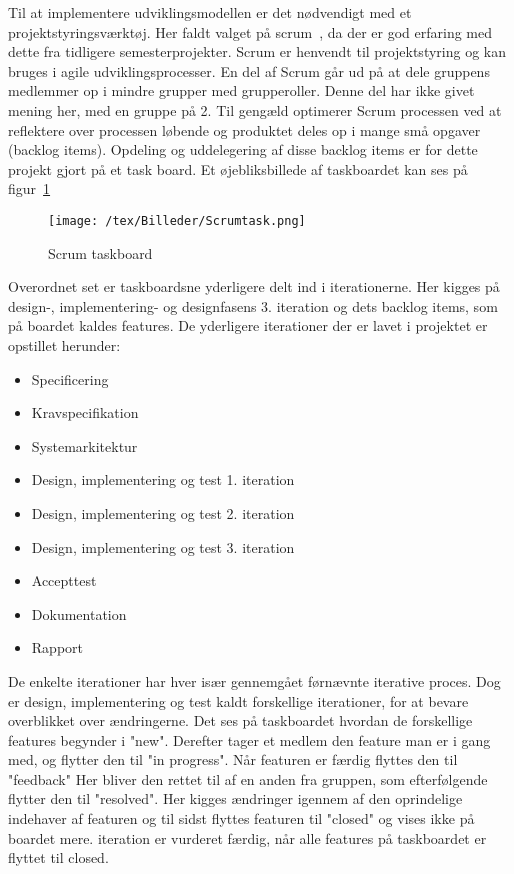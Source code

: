 Til at implementere udviklingsmodellen er det nødvendigt med et projektstyringsværktøj. Her faldt valget på scrum~\cite{Scrum}, da der er god erfaring med dette fra tidligere semesterprojekter. Scrum er henvendt til projektstyring og kan bruges i agile udviklingsprocesser. En del af Scrum går ud på at dele gruppens medlemmer op i mindre grupper med grupperoller. Denne del har ikke givet mening her, med en gruppe på 2. 
Til gengæld optimerer Scrum processen ved at reflektere over processen løbende og produktet deles op i mange små opgaver (backlog items). Opdeling og uddelegering af disse backlog items er for dette projekt gjort på et task board. Et øjebliksbillede af taskboardet kan ses på figur~\ref{fig:Taskboard} 
\begin{figure}[H]
	\center
	\texttt{[image: /tex/Billeder/Scrumtask.png]}
	\caption{Scrum taskboard}
	\label{fig:Taskboard}
\end{figure} 
Overordnet set er taskboardsne yderligere delt ind i iterationerne. Her kigges på design-, implementering- og designfasens 3. iteration og dets backlog items, som på boardet kaldes features. De yderligere iterationer der er lavet i projektet er opstillet herunder:

\begin{itemize}
\item Specificering
\item Kravspecifikation
\item Systemarkitektur
\item Design, implementering og test 1. iteration
\item Design, implementering og test 2. iteration
\item Design, implementering og test 3. iteration
\item Accepttest
\item Dokumentation
\item Rapport
\end{itemize}

De enkelte iterationer har hver især gennemgået førnævnte iterative proces. Dog er design, implementering og test kaldt forskellige iterationer, for at bevare overblikket over ændringerne. Det ses på taskboardet hvordan de forskellige features begynder i "new". Derefter tager et medlem den feature man er i gang med, og flytter den til "in progress". Når featuren er færdig flyttes den til "feedback" Her bliver den rettet til af en anden fra gruppen, som efterfølgende flytter den til "resolved". Her kigges ændringer igennem af den oprindelige indehaver af featuren og til sidst flyttes featuren til "closed" og vises ikke på boardet mere. 
iteration er vurderet færdig, når alle features på taskboardet er flyttet til closed.